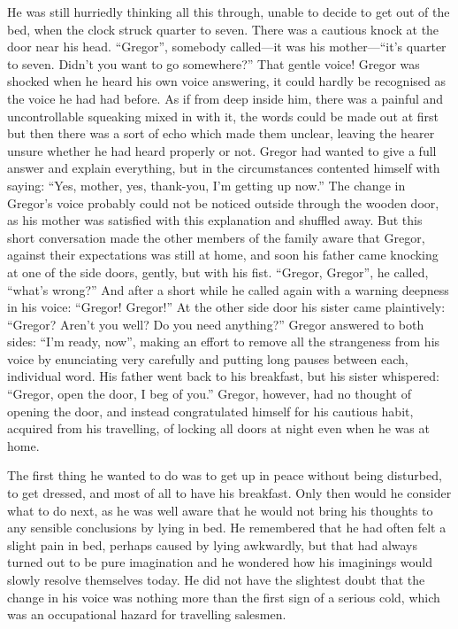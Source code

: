 He was still hurriedly thinking all this through, unable to decide to
get out of the bed, when the clock struck quarter to seven. There was a
cautious knock at the door near his head. “Gregor”, somebody called—it
was his mother—“it’s quarter to seven. Didn’t you want to go
somewhere?” That gentle voice! Gregor was shocked when he heard his own
voice answering, it could hardly be recognised as the voice he had had
before. As if from deep inside him, there was a painful and
uncontrollable squeaking mixed in with it, the words could be made out
at first but then there was a sort of echo which made them unclear,
leaving the hearer unsure whether he had heard properly or not. Gregor
had wanted to give a full answer and explain everything, but in the
circumstances contented himself with saying: “Yes, mother, yes,
thank-you, I’m getting up now.” The change in Gregor’s voice probably
could not be noticed outside through the wooden door, as his mother was
satisfied with this explanation and shuffled away. But this short
conversation made the other members of the family aware that Gregor,
against their expectations was still at home, and soon his father came
knocking at one of the side doors, gently, but with his fist. “Gregor,
Gregor”, he called, “what’s wrong?” And after a short while he called
again with a warning deepness in his voice: “Gregor! Gregor!” At the
other side door his sister came plaintively: “Gregor? Aren’t you well?
Do you need anything?” Gregor answered to both sides: “I’m ready, now”,
making an effort to remove all the strangeness from his voice by
enunciating very carefully and putting long pauses between each,
individual word. His father went back to his breakfast, but his sister
whispered: “Gregor, open the door, I beg of you.” Gregor, however, had
no thought of opening the door, and instead congratulated himself for
his cautious habit, acquired from his travelling, of locking all doors
at night even when he was at home.

The first thing he wanted to do was to get up in peace without being
disturbed, to get dressed, and most of all to have his breakfast. Only
then would he consider what to do next, as he was well aware that he
would not bring his thoughts to any sensible conclusions by lying in
bed. He remembered that he had often felt a slight pain in bed, perhaps
caused by lying awkwardly, but that had always turned out to be pure
imagination and he wondered how his imaginings would slowly resolve
themselves today. He did not have the slightest doubt that the change
in his voice was nothing more than the first sign of a serious cold,
which was an occupational hazard for travelling salesmen.

